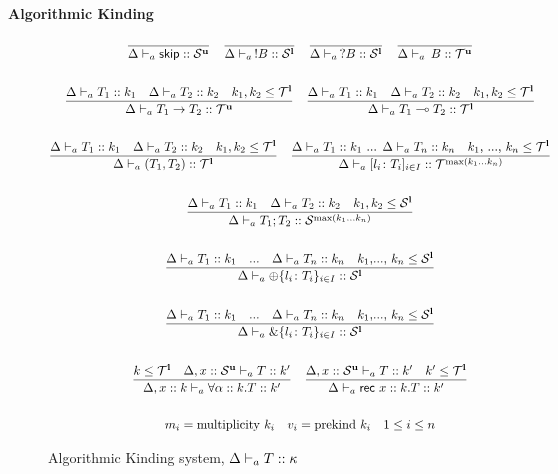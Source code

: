 \documentclass[12pt,openright,twoside]{report}
\begin{document}
	\begin{center}
		\textbf{Algorithmic Kinding}
	\end{center}

\begin{figure}[ht]
\centering
  \begin{gather*}
	\frac{}{\Delta \vdash_{a} \mathsf{skip} :: \mathcal S^{\mathbf{u}}} \quad
	\frac{}{\Delta \vdash_{a} \,!B :: \mathcal S^{\mathbf{l}}} \quad 
	\frac{}{\Delta \vdash_{a} \,?B :: \mathcal S^{\mathbf{l}}} \quad
	\frac{}{\Delta \vdash_{a} \,B :: \mathcal T^{\mathbf{u}}}	
    \\\\
    \frac{\Delta \vdash_{a} T_1 :: k_1 \quad \Delta \vdash_{a} T_2 :: k_2 \quad k_1, k_2 \le \mathcal T^{\mathbf{l}}}
    	{\Delta \vdash_{a} T_1 \to T_2 :: \mathcal T^{\mathbf{u}}}	
	\quad
    \frac{\Delta \vdash_{a} T_1 :: k_1 \quad \Delta \vdash_{a} T_2 :: k_2 \quad k_1, k_2 \le \mathcal T^{\mathbf{l}}}
    	{\Delta \vdash_{a} T_1 \multimap T_2 :: \mathcal T^{\mathbf{l}}}	
    \\\\
    \frac{\Delta \vdash_{a} T_1 :: k_1 \quad \Delta \vdash_{a} T_2 :: k_2 \quad k_1, k_2 \le \mathcal T^{\mathbf{l}}}
    	{\Delta \vdash_{a} (T_1,T_2) :: \mathcal T^{\mathbf{l}}}	
	\quad
    \frac{\Delta \vdash_{a} T_1 :: k_1 \mbox{ ... } \Delta \vdash_{a} T_n :: k_n \quad k_1\mbox{, ..., } k_n \le \mathcal T^{\mathbf{l}}}
    	{\Delta \vdash_{a} [l_i\colon T_i]_{i\in I} :: \mathcal T^{\max(k_1 ... k_n)}}	
	\\\\
	\frac{\Delta \vdash_{a} T_1 :: k_1 \quad \Delta \vdash_{a} T_2 :: k_2 \quad k_1, k_2 \le \mathcal S^{\mathbf{l}}}
    	{\Delta \vdash_{a} T_1;T_2 :: \mathcal S^{\max(k_1 ... k_n)}}	    
	\\\\
		\frac{\Delta \vdash_{a} T_1 :: k_1 \quad \mbox{...} \quad \Delta \vdash_{a} T_n :: k_n \quad k_1\mbox{,..., }k_n \le \mathcal S^{\mathbf{l}}}{
      \Delta \vdash_{a} \oplus\{l_i\colon T_i\}_{i\in I} :: \mathcal S^{\mathbf{l}}}
    \\\\
    \frac{\Delta \vdash_{a} T_1 :: k_1 \quad \mbox{...} \quad \Delta \vdash_{a} T_n :: k_n \quad k_1\mbox{,..., }k_n \le \mathcal S^{\mathbf{l}}}
    { \Delta \vdash_{a} \&\{l_i\colon T_i\}_{i\in I} :: \mathcal S^{\mathbf{l}}}
	\\\\
	 \frac{k \le \mathcal T^{\mathbf{l}} \quad \Delta, x :: \mathcal S^{\mathbf{u}} \vdash_{a} T :: k'}{\Delta, x :: k \vdash_{a} \forall \alpha :: k.T :: k'}
	\quad
	\frac{\Delta, x :: \mathcal S^{\mathbf{u}} \vdash_{a} T :: k' \quad k' \le \mathcal T^{\mathbf{l}}}{\Delta \vdash_{a} \mathsf{rec} \mbox{ } x :: k.T :: k'}
	 \\\\
	m_i = \mbox{multiplicity } k_i \quad v_i = \mbox{prekind } k_i \quad 1 \le i \le n 
	\end{gather*}
  \caption{Algorithmic Kinding system, $\Delta \vdash_{a} T :: \kappa$}
  \label{fig:kinding}
\end{figure}
 
%



\end{document}
